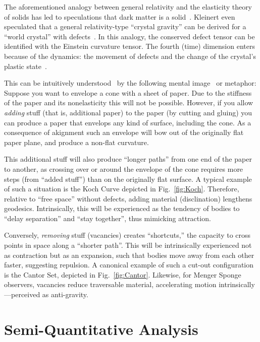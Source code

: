 \documentclass[%
  reprint,
  superscriptaddress,
  showpacs,
  showkeys,
  amsmath,amssymb,
  pra,
  longbibliography,
  floatfix,
]{revtex4-2}
\begin{document}
The aforementioned analogy between general relativity and the elasticity theory of solids
has led to speculations that dark matter is a solid~\cite{Bucher-PhysRevD.60.043505}.
Kleinert even speculated that a general relativity-type ``crystal gravity'' can be derived for a ``world crystal'' with defects~\cite{kleinert-1987,kleinert-2000,kroner-2001,kleinert-2004}.
In this analogy, the conserved defect tensor can be identified with the Einstein curvature tensor.
The fourth (time) dimension enters because of the dynamics: the movement of defects and the change of the crystal's plastic state~\cite{amari-1968}.

This can be intuitively understood~\cite{zaanen-2022} by the following mental image~\cite{hertz-94e} or metaphor:
Suppose you want to envelope a cone with a sheet of paper.
Due to the stiffness of the paper and its nonelasticity this will not be possible.
However, if you allow \emph{adding} stuff (that is, additional paper) to the paper (by cutting and gluing) you can
produce a paper that envelops any kind of surface, including the cone. As a consequence of akignment such an envelope will bow out of the originally flat
paper plane, and produce a non-flat curvature.

This additional stuff will also produce  ``longer paths'' from one end of the paper to another,
as crossing over or around the envelope of the cone requires more steps (from ``added stuff'') than on the originally flat surface.
A typical example of such a situation is the Koch Curve depicted in Fig.~\ref{fig:Koch}.
Therefore, relative to ``free space'' without defects, adding material (disclination) lengthens geodesics.
Intrinsically, this will be experienced as the tendency of bodies to ``delay separation'' and ``stay together'', thus mimicking attraction.

Conversely, \emph{removing} stuff (vacancies) creates ``shortcuts,'' the capacity to cross points in space
along a ``shorter path''. This will be intrinsically experienced not as contraction but as an expansion,
such that bodies move away from each other faster, suggesting repulsion.
A canonical example of such a cut-out configuration is the Cantor Set, depicted in Fig.~\ref{fig:Cantor}.
Likewise, for Menger Sponge observers, vacancies reduce traversable material, accelerating motion intrinsically---perceived as anti-gravity.

\section{Semi-Quantitative Analysis}
\label{sec:quant}
\end{document}
